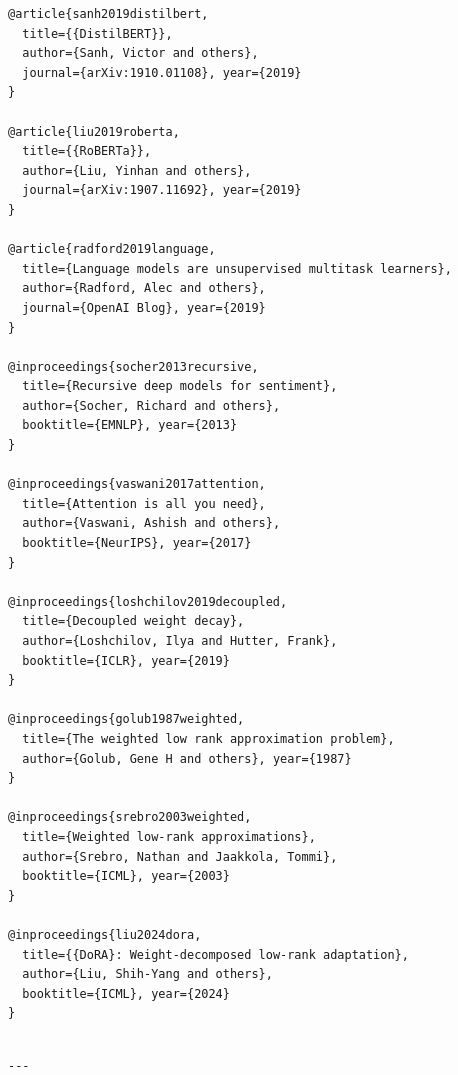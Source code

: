 \begin{lstlisting}
@article{sanh2019distilbert,
  title={{DistilBERT}},
  author={Sanh, Victor and others},
  journal={arXiv:1910.01108}, year={2019}
}

@article{liu2019roberta,
  title={{RoBERTa}},
  author={Liu, Yinhan and others},
  journal={arXiv:1907.11692}, year={2019}
}

@article{radford2019language,
  title={Language models are unsupervised multitask learners},
  author={Radford, Alec and others},
  journal={OpenAI Blog}, year={2019}
}

@inproceedings{socher2013recursive,
  title={Recursive deep models for sentiment},
  author={Socher, Richard and others},
  booktitle={EMNLP}, year={2013}
}

@inproceedings{vaswani2017attention,
  title={Attention is all you need},
  author={Vaswani, Ashish and others},
  booktitle={NeurIPS}, year={2017}
}

@inproceedings{loshchilov2019decoupled,
  title={Decoupled weight decay},
  author={Loshchilov, Ilya and Hutter, Frank},
  booktitle={ICLR}, year={2019}
}

@inproceedings{golub1987weighted,
  title={The weighted low rank approximation problem},
  author={Golub, Gene H and others}, year={1987}
}

@inproceedings{srebro2003weighted,
  title={Weighted low-rank approximations},
  author={Srebro, Nathan and Jaakkola, Tommi},
  booktitle={ICML}, year={2003}
}

@inproceedings{liu2024dora,
  title={{DoRA}: Weight-decomposed low-rank adaptation},
  author={Liu, Shih-Yang and others},
  booktitle={ICML}, year={2024}
}
\end{lstlisting}
\begin{lstlisting}

---
\end{lstlisting}